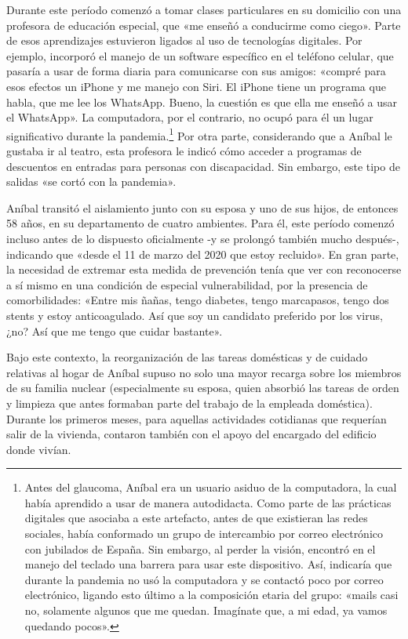 \begin{refsection}
Durante este período comenzó a tomar clases particulares en su domicilio con una profesora de educación especial, que «me enseñó a conducirme como ciego». Parte de esos aprendizajes estuvieron ligados al uso de tecnologías digitales. Por ejemplo, incorporó el manejo de un software específico en el teléfono celular, que pasaría a usar de forma diaria para comunicarse con sus amigos: «compré para esos efectos un iPhone y me manejo con Siri. El iPhone tiene un programa que habla, que me lee los WhatsApp. Bueno, la cuestión es que ella me enseñó a usar el WhatsApp». La computadora, por el contrario, no ocupó para él un lugar significativo durante la pandemia.\footnote{Antes del glaucoma, Aníbal era un usuario asiduo de la computadora, la
        cual había aprendido a usar de manera autodidacta. Como parte de las
        prácticas digitales que asociaba a este artefacto, antes de que
        existieran las redes sociales, había conformado un grupo de
        intercambio por correo electrónico con jubilados de España. Sin
        embargo, al perder la visión, encontró en el manejo del teclado una
        barrera para usar este dispositivo. Así, indicaría que durante la
        pandemia no usó la computadora y se contactó poco por correo
        electrónico, ligando esto último a la composición etaria del grupo:
        «mails casi no, solamente algunos que me quedan. Imagínate que,
        a mi edad, ya vamos quedando pocos».} Por otra parte, considerando que a Aníbal le gustaba ir al teatro, esta profesora le indicó cómo acceder a programas de descuentos en entradas para personas con discapacidad. Sin embargo, este tipo de salidas «se cortó con la pandemia».

Aníbal transitó el aislamiento junto con su esposa y uno de sus hijos, de entonces 58 años, en su departamento de cuatro ambientes. Para él, este período comenzó incluso antes de lo dispuesto oficialmente -y se prolongó también mucho después-, indicando que «desde el 11 de marzo del 2020 que estoy recluido». En gran parte, la necesidad de extremar esta medida de prevención tenía que ver con reconocerse a sí mismo en una condición de especial vulnerabilidad, por la presencia de comorbilidades: «Entre mis ñañas, tengo diabetes, tengo marcapasos, tengo dos stents y estoy anticoagulado. Así que soy un candidato preferido por los virus, ¿no? Así que me tengo que cuidar bastante».

Bajo este contexto, la reorganización de las tareas domésticas y de cuidado relativas al hogar de Aníbal supuso no solo una mayor recarga sobre los miembros de su familia nuclear (especialmente su esposa, quien absorbió las tareas de orden y limpieza que antes formaban parte del trabajo de la empleada doméstica). Durante los primeros meses, para aquellas actividades cotidianas que requerían salir de la vivienda, contaron también con el apoyo del encargado del edificio donde vivían.



\end{refsection}
